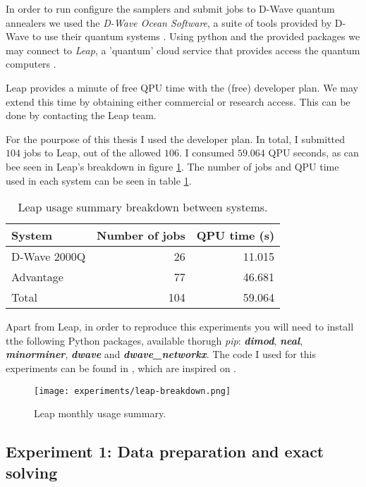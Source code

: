 In order to run configure the samplers and submit jobs to D-Wave quantum annealers we used the \emph{D-Wave Ocean Software}, a suite of tools provided by D-Wave to use their quantum systems \cite{DWave-OceanDoc}. Using python and the provided packages we may connect to \emph{Leap}, a 'quantum' cloud service that provides access the quantum computers \cite{DWave-Leap}.

Leap provides a minute of free QPU time with the (free) developer plan. We may extend this time by obtaining either commercial or research access. This can be done by contacting the Leap team.

For the pourpose of this thesis I used the developer plan. In total, I submitted $104$ jobs to Leap, out of the allowed $106$. I consumed $59.064$ QPU seconds, as can bee seen in Leap's breakdown in figure \ref{fig:leap-breakdown}. The number of jobs and QPU time used in each system can be seen in table \ref{tab:leap-breakdown}.

\begin{table}[H]
	\centering
	\begin{tabular}{lrr}
		\textbf{System} & \textbf{Number of jobs} & \textbf{QPU time (s)} \\
		\hline
		D-Wave 2000Q	& 26	& 11.015	\\
		Advantage		& 77	& 46.681	\\
		Total			& 104	& 59.064                     
	\end{tabular}
	\caption{Leap usage summary breakdown between systems.}
	\label{tab:leap-breakdown}
\end{table}

Apart from Leap, in order to reproduce this experiments you will need to install tthe following Python packages, available thorugh \emph{pip}: \textbf{\emph{dimod}}, \textbf{\emph{neal}}, \textbf{\emph{minorminer}}, \textbf{\emph{dwave}} and \textbf{\emph{dwave\_networkx}}. The code I used for this experiments can be found in \cite{thesis-code}, which are inspired on \cite{Sarkar2020}.

\begin{figure}[H]
	\texttt{[image: experiments/leap-breakdown.png]}
	\centering
	\caption{Leap monthly usage summary.}
	\label{fig:leap-breakdown}
\end{figure}


\subsection{Experiment 1: Data preparation and exact solving}


